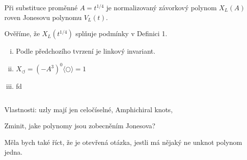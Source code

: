 \begin{veta}
Při substituce proměnné $A = t^{1/4}$ je normalizovaný závorkový polynom $X_L(A)$  roven Jonesovu polynomu $V_L(t)$.
\end{veta}
\begin{dukaz}
Ověříme, že $X_L(t^{1/4})$ splňuje podmínky v Definici 1.

\begin{enumerate}[i.]
\item
Podle předchozího tvrzení je linkový invariant.
\item
$X_\circlearrowleft = (-A^3)^0 \langle \bigcirc  \rangle = 1$ 
\item
fd
\end{enumerate}
$ $
\end{dukaz}



Vlastnosti:
uzly mají jen celočíselné, Amphichiral knots, 

Zminit, jake polynomy jsou zobecněním Jonesova?

Měla bych také říct, že je otevřená otázka, jestli má nějaký ne unknot polynom jedna.